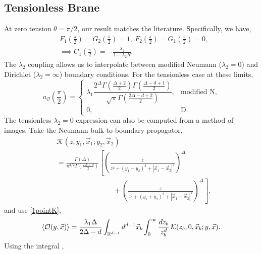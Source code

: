 \documentclass[reprint,amsmath,amssymb,aps,nofootinbib,twocolumn]{revtex4-2}
\begin{document}
\begin{appendix}
\subsection{Tensionless Brane}

At zero tension $\theta = \pi/2$, our result matches the literature. Specifically, we have,
\begin{align}
&F_1\left(\frac{\pi}{2}\right) = G_2\left(\frac{\pi}{2}\right) = 1,\ F_{2}\left(\frac{\pi}{2}\right) = G_{1}\left(\frac{\pi}{2}\right) = 0,\\
&\implies C_1\left(\frac{\pi}{2}\right) = -\frac{\lambda_1}{1-\lambda_2 R}.
\end{align}
The $\lambda_2$ coupling allows us to interpolate between modified Neumann ($\lambda_2 = 0$) and Dirichlet ($\lambda_2 = \infty$) boundary conditions. For the tensionless case at these limits,
\begin{equation}
a_\mathcal{O}\left(\frac{\pi}{2}\right) = \begin{cases}
\lambda_1 \dfrac{2^\Delta \Gamma\left(\frac{\Delta+2}{2}\right)\Gamma\left(\frac{\Delta - d + 1}{2}\right)}{\sqrt{\pi}\Gamma\left(\frac{2\Delta - d + 2}{2}\right)},&\text{modified N},\\
0,&\text{D}.
\end{cases}\label{tensionlessA}
\end{equation}
The tensionless $\lambda_2 = 0$ expression can also be computed from a method of images. Take the Neumann bulk-to-boundary propagator,
\begin{equation}
\begin{split}
&\mathcal{K}(z,y_1,\vec{x}_1;y_2,\vec{x}_2)\\
&= \frac{\Gamma(\Delta)}{\pi^{d/2}\Gamma\left(\frac{2\Delta - d}{2}\right)}
\left[\left(\frac{z}{z^2 + (y_1 - y_2)^2 + |\vec{x}_1 - \vec{x}_2|^2}\right)^{\Delta}\right.\\
&\qquad\qquad\qquad\qquad+\left.\left(\frac{z}{z^2 + (y_1 + y_2)^2 + |\vec{x}_1 - \vec{x}_2|^2}\right)^{\Delta}\right],
\end{split}
\end{equation}
and use \eqref{1pointK},
\begin{equation}
\expval{\mathcal{O}(y,\vec{x})} = \frac{\lambda_1\Delta}{2\Delta - d}\int_{\mathbb{R}^{d-1}} d^{d-1} \vec{x}_b \int_0^\infty \frac{dz_b}{z_b^d} \,\mathcal{K}(z_b,0,\vec{x}_b;y,\vec{x}).
\label{againstbrane}
\end{equation}
Using the integral \cite{Rastelli:2017ecj},%

\end{appendix}
\end{document}
